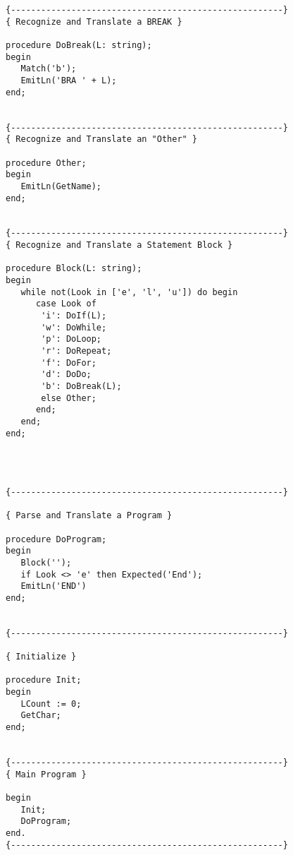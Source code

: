 \begin{verbatim}
{------------------------------------------------------}
{ Recognize and Translate a BREAK }

procedure DoBreak(L: string);
begin
   Match('b');
   EmitLn('BRA ' + L);
end;


{------------------------------------------------------}
{ Recognize and Translate an "Other" }

procedure Other;
begin
   EmitLn(GetName);
end;


{------------------------------------------------------}
{ Recognize and Translate a Statement Block }

procedure Block(L: string);
begin
   while not(Look in ['e', 'l', 'u']) do begin
      case Look of
       'i': DoIf(L);
       'w': DoWhile;
       'p': DoLoop;
       'r': DoRepeat;
       'f': DoFor;
       'd': DoDo;
       'b': DoBreak(L);
       else Other;
      end;
   end;
end;




{------------------------------------------------------}

{ Parse and Translate a Program }

procedure DoProgram;
begin
   Block('');
   if Look <> 'e' then Expected('End');
   EmitLn('END')
end;


{------------------------------------------------------}

{ Initialize }

procedure Init;
begin
   LCount := 0;
   GetChar;
end;


{------------------------------------------------------}
{ Main Program }

begin
   Init;
   DoProgram;
end.
{------------------------------------------------------}
\end{verbatim}
